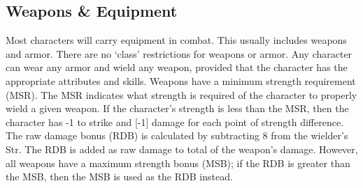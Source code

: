 \documentclass[twoside]{book}
\begin{document}
    

\subsection{Weapons \& Equipment}
     Most characters will carry equipment in combat. This
               usually includes weapons and armor. There are no
               `class' restrictions for weapons or armor. Any
               character can wear any armor and wield any weapon,
               provided that the character has the appropriate attributes
               and skills.  Weapons have a minimum strength requirement (MSR).
               The MSR indicates what strength is required of the
               character to properly wield a given weapon. If the
               character's strength is less than the MSR, then the
               character has -1 to strike and [-1] damage for each point
               of strength difference.  The raw damage bonus (RDB) is calculated by
               subtracting 8 from the wielder's Str. The RDB is
               added as raw damage to total of the weapon's damage.
               However, all weapons have a maximum strength bonus (MSB);
               if the RDB is greater than the MSB, then the MSB is used
               as the RDB instead. 
  

  

  
  

  
\end{document}
